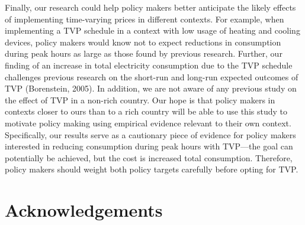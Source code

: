 \documentclass[12pt]{article}
\begin{document}

Finally, our research could help policy makers better anticipate the likely effects of implementing time-varying prices in different contexts. For example, when implementing a TVP schedule in a context with low usage of heating and cooling devices, policy makers would know not to expect reductions in consumption during peak hours as large as those found by previous research. Further, our finding of an increase in total electricity consumption due to the TVP schedule challenges previous research on the short-run and long-run expected outcomes of TVP (Borenstein, 2005). In addition, we are not aware of any previous study on the effect of TVP in a non-rich country. Our hope is that policy makers in contexts closer to ours than to a rich country will be able to use this study to motivate policy making using empirical evidence relevant to their own context. Specifically, our results serve as a cautionary piece of evidence for policy makers interested in reducing consumption during peak hours with TVP---the goal can potentially be achieved, but the cost is increased total consumption. Therefore, policy makers should weight both policy targets carefully before opting for TVP.

\clearpage




\clearpage


\section*{Acknowledgements}



\clearpage

%
%
%
%
%
%   
%
%
%
\end{document}

